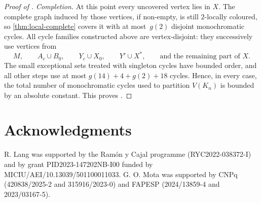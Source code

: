 \documentclass[a4paper,12pt,reqno]{amsart}
\begin{document}
\begin{proof}[Proof of ]
\medskip
\noindent\emph{Completion.}
At this point every uncovered vertex lies in $X$.  The complete graph induced
by those vertices, if non-empty, is still $2$-locally coloured, so
\cref{thm:local-complete} covers it with at most~$g(2)$ disjoint
monochromatic cycles.  All cycle families constructed above are
vertex-disjoint: they successively use vertices from
\[
  M,\qquad A_c\cup B_0,\qquad Y_c\cup X_0,\qquad Y'\cup X^*,
  \qquad\text{and the remaining part of }X.
\]
The small exceptional sets treated with singleton cycles have bounded order,
and all other steps use at most $g(14)+4+g(2)+18$ cycles. Hence, in every case,
the total number of monochromatic cycles used to partition $V(K_n)$ is bounded
by an absolute constant. 
This proves .
\end{proof}


	\section*{Acknowledgments}

R. Lang was supported by the Ramón y Cajal programme (RYC2022-038372-I) and by
grant PID2023-147202NB-I00 funded by MICIU/AEI/10.13039/501100011033. G. O. Mota
was supported by CNPq (420838/2025-2 and 315916/2023-0) and FAPESP (2024/13859-4
and 2023/03167-5).
\end{document}
